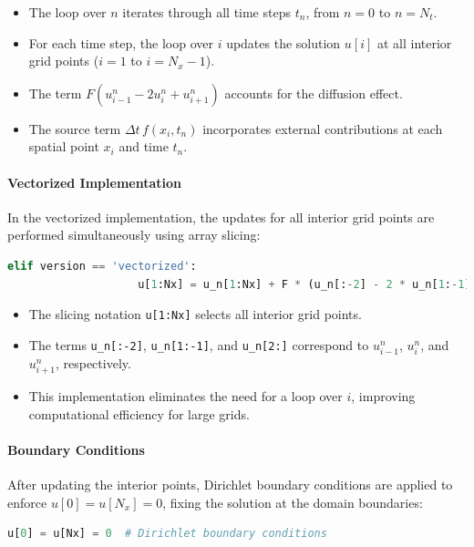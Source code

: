 \documentclass{article}
\begin{document}
			\begin{itemize}
				\item The loop over \( n \) iterates through all time steps \( t_n \), from \( n = 0 \) to \( n = N_t \).
				\item For each time step, the loop over \( i \) updates the solution \( u[i] \) at all interior grid points (\( i = 1 \) to \( i = N_x - 1 \)).
				\item The term \( F \left( u_{i-1}^n - 2u_i^n + u_{i+1}^n \right) \) accounts for the diffusion effect.
				\item The source term \( \Delta t \, f(x_i, t_n) \) incorporates external contributions at each spatial point \( x_i \) and time \( t_n \).
			\end{itemize}
			
			\paragraph{Vectorized Implementation}
			
			In the vectorized implementation, the updates for all interior grid points are performed simultaneously using array slicing:
			\begin{lstlisting}[language=Python]
				elif version == 'vectorized':
					u[1:Nx] = u_n[1:Nx] + F * (u_n[:-2] - 2 * u_n[1:-1] + u_n[2:]) + dt * f(x[1:Nx], t[n])
			\end{lstlisting}
			
			\begin{itemize}
				\item The slicing notation \texttt{u[1:Nx]} selects all interior grid points.
				\item The terms \texttt{u\_n[:-2]}, \texttt{u\_n[1:-1]}, and \texttt{u\_n[2:]} correspond to \( u_{i-1}^n \), \( u_i^n \), and \( u_{i+1}^n \), respectively.
				\item This implementation eliminates the need for a loop over \( i \), improving computational efficiency for large grids.
			\end{itemize}
			
			\paragraph{Boundary Conditions}
			
			After updating the interior points, Dirichlet boundary conditions are applied to enforce \( u[0] = u[N_x] = 0 \), fixing the solution at the domain boundaries:
			\begin{lstlisting}[language=Python]
				u[0] = u[Nx] = 0  # Dirichlet boundary conditions
			\end{lstlisting}
			
\end{document}
